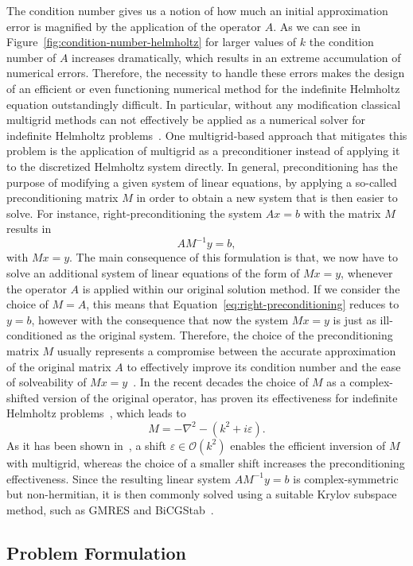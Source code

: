 The condition number gives us a notion of how much an initial approximation error is magnified by the application of the operator $A$.
As we can see in Figure~\ref{fig:condition-number-helmholtz} for larger values of $k$ the condition number of $A$ increases dramatically, which results in an extreme accumulation of numerical errors. 
Therefore, the necessity to handle these errors makes the design of an efficient or even functioning numerical method for the indefinite Helmholtz equation outstandingly difficult.
In particular, without any modification classical multigrid methods can not effectively be applied as a numerical solver for indefinite Helmholtz problems~\cite{ernst2012difficult}.
One multigrid-based approach that mitigates this problem is the application of multigrid as a preconditioner instead of applying it to the discretized Helmholtz system directly.
In general, preconditioning has the purpose of modifying a given system of linear equations, by applying a so-called preconditioning matrix $M$ in order to obtain a new system that is then easier to solve.
For instance, right-preconditioning the system $A x = b$ with the matrix $M$ results in
\begin{equation}
	A M^{-1} y = b,
	\label{eq:right-preconditioning}
\end{equation}
with $M x = y$. 
The main consequence of this formulation is that, we now have to solve an additional system of linear equations of the form of $M x = y$, whenever the operator $A$ is applied within our original solution method.
If we consider the choice of $M = A$, this means that Equation~\eqref{eq:right-preconditioning} reduces to $y = b$, however with the consequence that now the system $M x = y$ is just as ill-conditioned as the original system.
Therefore, the choice of the preconditioning matrix $M$ usually represents a compromise between the accurate approximation of the original matrix $A$ to effectively improve its condition number and the ease of solveability of $M x = y$~\cite{benzi2002preconditioning}.
In the recent decades the choice of $M$ as a complex-shifted version of the original operator, has proven its effectiveness for indefinite Helmholtz problems~\cite{erlangga2004preconditioner,erlangga2008advances,cocquet2017shift}, which leads to
\begin{equation*}
	M = -\nabla ^{2} - (k^{2} + i \varepsilon).
\end{equation*}
As it has been shown in~\cite{cocquet2017shift}, a shift $\varepsilon \in \mathcal{O}(k^2)$ enables the efficient inversion of $M$ with multigrid, whereas the choice of a smaller shift increases the preconditioning effectiveness.
Since the resulting linear system $A M^{-1} y = b$ is complex-symmetric but non-hermitian, it is then commonly solved using a suitable Krylov subspace method, such as GMRES and BiCGStab~\cite{saad2003iterative}.
\subsection{Problem Formulation}